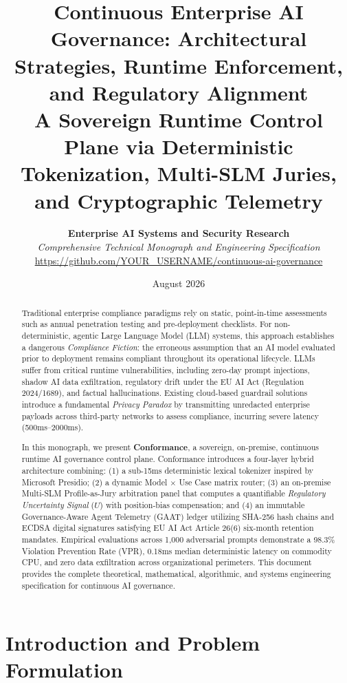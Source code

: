 \documentclass[11pt,a4paper]{article}
\title{\textbf{Continuous Enterprise AI Governance: Architectural Strategies, Runtime Enforcement, and Regulatory Alignment}\\[0.5em]
\large A Sovereign Runtime Control Plane via Deterministic Tokenization, Multi-SLM Juries, and Cryptographic Telemetry}
\author{
  \textbf{Enterprise AI Systems and Security Research}\\[0.5em]
  \textit{Comprehensive Technical Monograph and Engineering Specification}\\[0.2em]
  \url{https://github.com/YOUR_USERNAME/continuous-ai-governance}
}
\date{August 2026}
\theoremstyle{definition}
\begin{document}
\maketitle

\begin{abstract}
Traditional enterprise compliance paradigms rely on static, point-in-time assessments such as annual penetration testing and pre-deployment checklists. For non-deterministic, agentic Large Language Model (LLM) systems, this approach establishes a dangerous \textit{Compliance Fiction}: the erroneous assumption that an AI model evaluated prior to deployment remains compliant throughout its operational lifecycle. LLMs suffer from critical runtime vulnerabilities, including zero-day prompt injections, shadow AI data exfiltration, regulatory drift under the EU AI Act (Regulation 2024/1689), and factual hallucinations. Existing cloud-based guardrail solutions introduce a fundamental \textit{Privacy Paradox} by transmitting unredacted enterprise payloads across third-party networks to assess compliance, incurring severe latency (500ms--2000ms). 

In this monograph, we present \textbf{Conformance}, a sovereign, on-premise, continuous runtime AI governance control plane. Conformance introduces a four-layer hybrid architecture combining: (1) a sub-15ms deterministic lexical tokenizer inspired by Microsoft Presidio; (2) a dynamic Model $\times$ Use Case matrix router; (3) an on-premise Multi-SLM Profile-as-Jury arbitration panel that computes a quantifiable \textit{Regulatory Uncertainty Signal} ($U$) with position-bias compensation; and (4) an immutable Governance-Aware Agent Telemetry (GAAT) ledger utilizing SHA-256 hash chains and ECDSA digital signatures satisfying EU AI Act Article 26(6) six-month retention mandates. Empirical evaluations across 1,000 adversarial prompts demonstrate a 98.3\% Violation Prevention Rate (VPR), 0.18ms median deterministic latency on commodity CPU, and zero data exfiltration across organizational perimeters. This document provides the complete theoretical, mathematical, algorithmic, and systems engineering specification for continuous AI governance.
\end{abstract}

\tableofcontents
\newpage

\section{Introduction and Problem Formulation}
\label{sec:intro}
\end{document}
